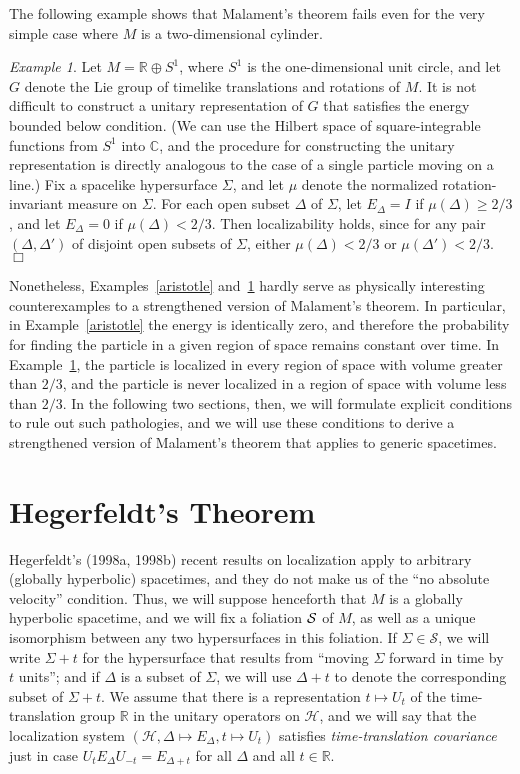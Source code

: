 \documentclass[11pt]{article}
\theoremstyle{remark}
\newtheorem{example}{Example}
\newcommand{\hil}[1]{\mathcal{#1}}
\begin{document}
The following example shows that Malament's theorem fails even for the
very simple case where $M$ is a two-dimensional cylinder.
\begin{example}  \label{cylinder} Let $M=\mathbb{R}\oplus S^{1}$, where $S^{1}$ is the
  one-dimensional unit circle, and let $G$ denote the Lie group of
  timelike translations and rotations of $M$.  It is not difficult to
  construct a unitary representation of $G$ that satisfies the energy
  bounded below condition.  (We can use the Hilbert space of
  square-integrable functions from $S^{1}$ into $\mathbb{C}$, and the
  procedure for constructing the unitary representation is directly
  analogous to the case of a single particle moving on a line.)  Fix a
  spacelike hypersurface $\Sigma$, and let $\mu$ denote the normalized
  rotation-invariant measure on $\Sigma$.  For each open subset
  $\Delta$ of $\Sigma$, let $E_{\Delta}=I$ if $\mu (\Delta )\geq 2/3$,
  and let $E_{\Delta}=0$ if $\mu (\Delta )<2/3$.  Then localizability
  holds, since for any pair $(\Delta ,\Delta ')$ of disjoint open
  subsets of $\Sigma$, either $\mu (\Delta )<2/3$ or $\mu (\Delta
  ')<2/3$.  \hfill $\Box$
\end{example}

Nonetheless, Examples~\ref{aristotle} and~\ref{cylinder} hardly serve
as physically interesting counterexamples to a strengthened version of
Malament's theorem.  In particular, in Example~\ref{aristotle} the
energy is identically zero, and therefore the probability for finding
the particle in a given region of space remains constant over time.
In Example~\ref{cylinder}, the particle is localized in every region
of space with volume greater than $2/3$, and the particle is never
localized in a region of space with volume less than $2/3$.  In the
following two sections, then, we will formulate explicit conditions to
rule out such pathologies, and we will use these conditions to derive
a strengthened version of Malament's theorem that applies to generic
spacetimes.

\section{Hegerfeldt's Theorem}
Hegerfeldt's (1998a, 1998b) recent results on localization apply to
arbitrary (globally hyperbolic) spacetimes, and they do not make us of
the ``no absolute velocity'' condition.  Thus, we will suppose
henceforth that $M$ is a globally hyperbolic spacetime, and we will
fix a foliation $\cal{S}$ of $M$, as well as a unique isomorphism
between any two hypersurfaces in this foliation.  If $\Sigma \in
\mathcal{S}$, we will write $\Sigma +t$ for the hypersurface that
results from ``moving $\Sigma$ forward in time by $t$ units''; and if
$\Delta$ is a subset of $\Sigma$, we will use $\Delta +t$ to denote
the corresponding subset of $\Sigma +t$.  We assume that there is a
representation $t\mapsto U_{t}$ of the time-translation group
$\mathbb{R}$ in the unitary operators on $\hil{H}$, and we will say
that the localization system $(\hil{H},\Delta \mapsto
E_{\Delta},t\mapsto U_{t})$ satisfies \emph{time-translation
  covariance} just in case $U_{t}E_{\Delta}U_{-t}=E_{\Delta +t}$ for
all $\Delta$ and all $t\in \mathbb{R}$.
\end{document}

